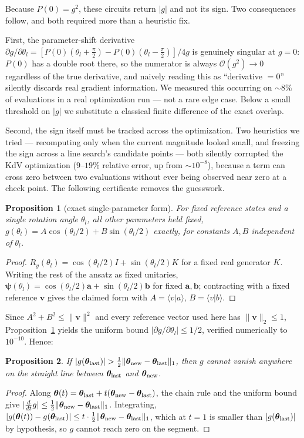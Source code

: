 \documentclass[aps,prx,twocolumn,notitlepage,superscriptaddress,floatfix,10pt]{revtex4-2}
\newtheorem{proposition}{Proposition}
\renewcommand{\braket}[2]{\langle #1 \vert #2 \rangle}
\newcommand{\norm}[1]{\lVert #1 \rVert}
\newcommand{\Oh}{\mathcal{O}}
\begin{document}
Because $P(0)=g^2$, these circuits return $|g|$ and not its sign. Two consequences follow, and both
required more than a heuristic fix.

First, the parameter-shift derivative
$\partial g/\partial\theta_l=[P(0)(\theta_l+\tfrac\pi2)-P(0)(\theta_l-\tfrac\pi2)]/4g$ is genuinely
singular at $g=0$: $P(0)$ has a double root there, so the numerator is always $\Oh(g^2)\to0$
regardless of the true derivative, and naively reading this as ``derivative $=0$'' silently discards
real gradient information. We measured this occurring on $\sim8\%$ of evaluations in a real
optimization run --- not a rare edge case. Below a small threshold on $|g|$ we substitute a classical
finite difference of the exact overlap.

Second, the sign itself must be tracked across the optimization. Two heuristics we tried --- recomputing
only when the current magnitude looked small, and freezing the sign across a line search's candidate
points --- both silently corrupted the KdV optimization ($9$--$19\%$ relative error, up from
$\sim10^{-8}$), because a term can cross zero between two evaluations without ever being observed near
zero at a check point. The following certificate removes the guesswork.

\begin{proposition}[exact single-parameter form]
\label{prop:form}
For fixed reference states and a single rotation angle $\theta_l$, all other parameters held fixed,
$g(\theta_l)=A\cos(\theta_l/2)+B\sin(\theta_l/2)$ exactly, for constants $A,B$ independent of
$\theta_l$.
\end{proposition}
\begin{proof}
$R_y(\theta_l)=\cos(\theta_l/2)I+\sin(\theta_l/2)K$ for a fixed real generator $K$. Writing the rest
of the ansatz as fixed unitaries, $\bm\psi(\theta_l)=\cos(\theta_l/2)\bm a+\sin(\theta_l/2)\bm b$ for
fixed $\bm a,\bm b$; contracting with a fixed reference $\bm v$ gives the claimed form with
$A=\braket va$, $B=\braket vb$.
\end{proof}

Since $A^2+B^2\le\norm{\bm v}^2$ and every reference vector used here has $\norm{\bm v}_2\le1$,
Proposition~\ref{prop:form} yields the uniform bound $|\partial g/\partial\theta_l|\le1/2$, verified
numerically to $10^{-10}$. Hence:

\begin{proposition}
\label{prop:cert}
If $|g(\bm\theta_{\rm last})|>\tfrac12\norm{\bm\theta_{\rm new}-\bm\theta_{\rm last}}_1$, then $g$
cannot vanish anywhere on the straight line between $\bm\theta_{\rm last}$ and $\bm\theta_{\rm new}$.
\end{proposition}
\begin{proof}
Along $\bm\theta(t)=\bm\theta_{\rm last}+t(\bm\theta_{\rm new}-\bm\theta_{\rm last})$, the chain rule
and the uniform bound give $|\tfrac{d}{dt}g|\le\tfrac12\norm{\bm\theta_{\rm new}-\bm\theta_{\rm
last}}_1$. Integrating, $|g(\bm\theta(t))-g(\bm\theta_{\rm last})|\le t\cdot\tfrac12\norm{\bm\theta_{\rm
new}-\bm\theta_{\rm last}}_1$, which at $t=1$ is smaller than $|g(\bm\theta_{\rm last})|$ by
hypothesis, so $g$ cannot reach zero on the segment.
\end{proof}
\end{document}
